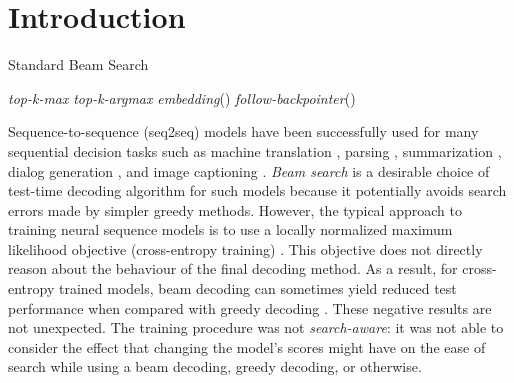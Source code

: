 \documentclass[letterpaper]{article} \usepackage{aaai18}  \usepackage{times}  \usepackage{helvet}  \usepackage{courier}  \usepackage{url}  \usepackage{graphicx}  \frenchspacing
\begin{document}
\section{Introduction}
\begin{algorithm*}[t]
\caption{Standard Beam Search}\label{hard}
\begin{algorithmic}[1]
\Initialize{\strut, , ,  }
\ForAll{}
\State  {}
\EndFor
\EndFor
 \State  \textit{top-k-max} 
 \State  \textit{top-k-argmax} 
  \State  \textit{embedding}()
  \State  {}
 \EndFor
\EndFor
 \State   \textit{follow-backpointer}()
 \State 
\end{algorithmic}
\end{algorithm*}
Sequence-to-sequence (seq2seq) models have been successfully used for many sequential decision tasks such as machine translation \cite{sutskever2014sequence,bahdanau2014neural}, parsing \cite{dyer2016recurrent,dyer2015transition}, summarization \cite{rush2015neural}, dialog generation \cite{serban2015building}, and image captioning \cite{xu2015show}.
\textit{Beam search} is a desirable choice of test-time decoding algorithm for such models because it potentially avoids search errors made by simpler greedy methods. However, the typical approach to training neural sequence models is to use a locally normalized maximum likelihood objective (cross-entropy training) \cite{sutskever2014sequence}. This objective does not directly reason about the behaviour of the final decoding method. As a result, for cross-entropy trained models, beam decoding can sometimes yield reduced test performance when compared with greedy decoding \cite{koehn2017six,neubig2017neural,cho2014properties}.
These negative results are not unexpected. The training procedure was not \emph{search-aware}: it was not able to consider the effect that changing the model's scores might have on the ease of search while using a beam decoding, greedy decoding, or otherwise. 
\end{document}
